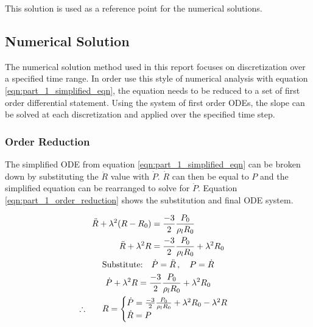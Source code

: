 \documentclass[12pt]{article}
\begin{document}
\noindent This solution is used as a reference point for the numerical solutions.

\subsection{Numerical Solution}
The numerical solution method used in this report focuses on discretization over a specified time range. In order use this style of numerical analysis with equation  \ref{eqn:part_1_simplified_eqn}, the equation needs to be reduced to a set of first order differential statement. Using the system of first order ODEs, the slope can be solved at each discretization and applied over the specified time step.

\subsubsection{Order Reduction} \label{sec:part_1_order_reduction}
The simplified ODE from equation \ref{eqn:part_1_simplified_eqn} can be broken down by substituting the $\ddot R$ value with $\dot P$. $\dot R$ can then be equal to $P$ and the simplified equation can be rearranged to solve for $\dot P$. Equation \ref{eqn:part_1_order_reduction} shows the substitution and final ODE system.

\begin{subequations}
    \centering
    \label{eqn:part_1_order_reduction}
    \begin{gather}
        \begin{aligned}
            \ddot R + \lambda^2 (R - R_0) &= \frac{-3}{2}\frac{P_0}{\rho_l R_0} \notag \\
            \ddot R + \lambda^2 R &= \frac{-3}{2}\frac{P_0}{\rho_l R_0} + \lambda^2 R_0 \notag
        \end{aligned} \\
        \text{Substitute:} \quad \dot P = \ddot R \, , \quad P = \dot R \\
        \dot P + \lambda^2 R = \frac{-3}{2}\frac{P_0}{\rho_l R_0} + \lambda^2 R_0 \notag \\
        {\large\therefore} \qquad R = 
        \begin{cases}
            \dot P = \frac{-3}{2}\frac{P_0}{\rho_l R_0} + \lambda^2 R_0 - \lambda^2 R \\
            \dot R = P
        \end{cases} \label{eqn:part_1_order_reduction_system}
    \end{gather}
\end{subequations}
\end{document}
